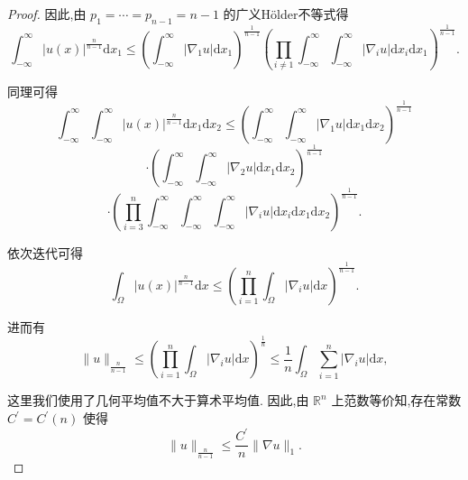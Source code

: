 \documentclass[lang=cn,newtx,10pt,scheme=chinese,thmcnt=chapter]{elegantbook}
\newcommand{\dif}{\mathrm{d}}
\begin{document}
\begin{problemset}
\begin{proof}
因此,由 \({p}_{1} = \cdots  = {p}_{n - 1} = n - 1\) 的广义Hölder不等式得
\begin{equation*}
{\int }_{-\infty }^{\infty }{\left| u\left( x\right) \right| }^{\frac{n}{n - 1}}\dif x_1 \leqslant  {\left( {\int }_{-\infty }^{\infty }\left| {\nabla }_{1}u\right| \dif x_1\right) }^{\frac{1}{n - 1}}{\left( \mathop{\prod }\limits_{{i \neq  1}}{\int }_{-\infty }^{\infty }{\int }_{-\infty }^{\infty }\left| {\nabla }_{i}u\right| \dif x_i\dif x_1\right) }^{\frac{1}{n - 1}}.
\end{equation*}

同理可得
\begin{equation*}
{\int }_{-\infty }^{\infty }{\int }_{-\infty }^{\infty }{\left| u\left( x\right) \right| }^{\frac{n}{n - 1}}\dif x_1\dif x_2 \leqslant  {\left( {\int }_{-\infty }^{\infty }{\int }_{-\infty }^{\infty }\left| {\nabla }_{1}u\right| \dif x_1\dif x_2\right) }^{\frac{1}{n - 1}}
\end{equation*}
\begin{equation*}
\cdot  {\left( {\int }_{-\infty }^{\infty }{\int }_{-\infty }^{\infty }\left| {\nabla }_{2}u\right| \dif x_1\dif x_2\right) }^{\frac{1}{n - 1}}
\end{equation*}
\begin{equation*}
\cdot  {\left( \mathop{\prod }\limits_{{i = 3}}^{n}{\int }_{-\infty }^{\infty }{\int }_{-\infty }^{\infty }{\int }_{-\infty }^{\infty }\left| {\nabla }_{i}u\right| \dif x_i\dif x_1\dif x_2\right) }^{\frac{1}{n - 1}}.
\end{equation*}

依次迭代可得
\begin{equation*}
{\int }_{\Omega }{\left| u\left( x\right) \right| }^{\frac{n}{n - 1}}{\dif x} \leqslant  {\left( \mathop{\prod }\limits_{{i = 1}}^{n}{\int }_{\Omega }\left| {\nabla }_{i}u\right| \dif x\right) }^{\frac{1}{n - 1}}.
\end{equation*}

进而有
\begin{equation*}
\parallel u{\parallel }_{\frac{n}{n - 1}} \leqslant  {\left( \mathop{\prod }\limits_{{i = 1}}^{n}{\int }_{\Omega }\left| {\nabla }_{i}u\right| \dif x\right) }^{\frac{1}{n}} \leqslant  \frac{1}{n}{\int }_{\Omega }\mathop{\sum }\limits_{{i = 1}}^{n}\left| {{\nabla }_{i}u}\right| {\dif x},
\end{equation*}

这里我们使用了几何平均值不大于算术平均值. 因此,由 \({\mathbb{R}}^{n}\) 上范数等价知,存在常数 \({C}^{\prime } = {C}^{\prime }\left( n\right)\) 使得
\begin{equation*}
\parallel u{\parallel }_{\frac{n}{n - 1}} \leqslant  \frac{{C}^{\prime }}{n}\parallel \nabla u{\parallel }_{1}.
\end{equation*}


\end{proof}
\end{problemset}
\end{document}
